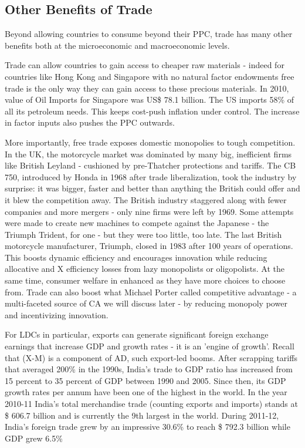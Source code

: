 \subsection{Other Benefits of Trade}
Beyond allowing countries to consume beyond their PPC, trade has many other benefits both at the microeconomic and macroeconomic levels.

Trade can allow countries to gain access to cheaper raw materials - indeed for countries like Hong Kong and Singapore with no natural factor endowments free trade is the only way they can gain access to these precious materials. In 2010, value of Oil Imports for Singapore was US\$ 78.1 billion. The US imports 58\% of all its petroleum needs. This keeps cost-push inflation under control. The increase in factor inputs also pushes the PPC outwards.

More importantly, free trade exposes domestic monopolies to tough competition. In the UK, the motorcycle market was dominated by many big, inefficient firms like British Leyland - cushioned by pre-Thatcher protections and tariffs. The CB 750, introduced by Honda in 1968 after trade liberalization, took the industry by surprise: it was bigger, faster and better than anything the British could offer and it blew the competition away. The British industry staggered along with fewer companies and more mergers - only nine firms were left by 1969. Some attempts were made to create new machines to compete against the Japanese - the Triumph Trident, for one - but they were too little, too late. The last British motorcycle manufacturer, Triumph, closed in 1983 after 100 years of operations. This boosts dynamic efficiency and encourages innovation while reducing allocative and X efficiency losses from lazy monopolists or oligopolists. At the same time, consumer welfare in enhanced as they have more choices to choose from. Trade can also boost what Michael Porter called competitive advantage - a multi-faceted source of CA we will discuss later - by reducing monopoly power and incentivizing innovation.

For LDCs in particular, exports can generate significant foreign exchange earnings that increase GDP and growth rates - it is an 'engine of growth'. Recall that (X-M) is a component of AD, such export-led booms. After scrapping tariffs that averaged 200\% in the 1990s, India's trade to GDP ratio has increased from 15 percent to 35 percent of GDP between 1990 and 2005. Since then, its GDP growth rates per annum have been one of the highest in the world. In the year 2010-11 India's total merchandise trade (counting exports and imports) stands at \$ 606.7 billion and is currently the 9th largest in the world. During 2011-12, India's foreign trade grew by an impressive 30.6\% to reach \$ 792.3 billion while GDP grew 6.5\%

